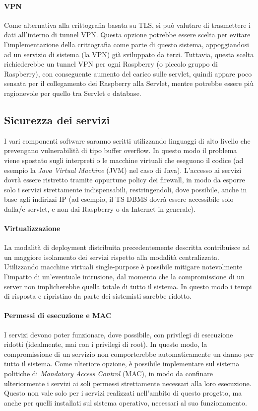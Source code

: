 \paragraph{VPN}
Come alternativa alla crittografia basata su TLS, si può valutare di trasmettere i dati all'interno di tunnel VPN.
Questa opzione potrebbe essere scelta per evitare l'implementazione della crittografia come parte di questo sistema, appoggiandosi ad un servizio di sistema (la VPN) già sviluppato da terzi.
Tuttavia, questa scelta richiederebbe un tunnel VPN per ogni Raspberry (o piccolo gruppo di Raspberry), con conseguente aumento del carico sulle servlet, quindi appare poco sensata per il collegamento dei Raspberry alla Servlet, mentre potrebbe essere più ragionevole per quello tra Servlet e database.

\subsection{Sicurezza dei servizi}
I vari componenti software saranno scritti utilizzando linguaggi di alto livello che prevengano vulnerabilità di tipo buffer overflow.
In questo modo il problema viene spostato sugli interpreti o le macchine virtuali che eseguono il codice (ad esempio la \textit{Java Virtual Machine} (JVM) nel caso di Java).
L'accesso ai servizi dovrà essere ristretto tramite oppurtune policy dei firewall, in modo da esporre solo i servizi strettamente indispensabili, restringendoli, dove possibile, anche in base agli indirizzi IP (ad esempio, il TS-DBMS dovrà essere accessibile solo dalla/e servlet, e non dai Raspberry o da Internet in generale).
\paragraph{Virtualizzazione}
La modalità di deployment distribuita precedentemente descritta contribuisce ad un maggiore isolamento dei servizi rispetto alla modalità centralizzata.
Utilizzando macchine virtuali single-purpose è possibile mitigare notevolmente l'impatto di un'eventuale intrusione, dal momento che la compromissione di un server non implicherebbe quella totale di tutto il sistema.
In questo modo i tempi di risposta e ripristino da parte dei sistemisti sarebbe ridotto.
\paragraph{Permessi di esecuzione e MAC}
I servizi devono poter funzionare, dove possibile, con privilegi di esecuzione ridotti (idealmente, mai con i privilegi di root).
In questo modo, la compromissione di un servizio non comporterebbe automaticamente un danno per tutto il sistema.
Come ulteriore opzione, è possibile implementare sul sistema politiche di \textit{Mandatory Access Control} (MAC), in modo da confinare ulteriormente i servizi ai soli permessi strettamente necessari alla loro esecuzione.
Questo non vale solo per i servizi realizzati nell'ambito di questo progetto, ma anche per quelli installati sul sistema operativo, necessari al suo funzionamento.
